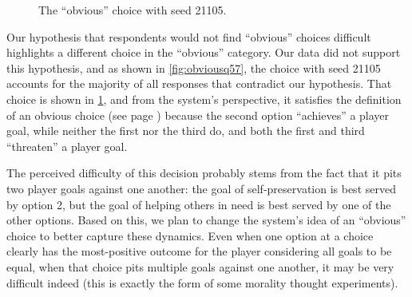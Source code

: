 \begin{figure}[h]
  \caption{The ``obvious'' choice with seed 21105.}
  \label{fig:ch21105}
\end{figure}


Our hypothesis that respondents would not find ``obvious'' choices difficult highlights a different choice in the ``obvious'' category.
%
Our data did not support this hypothesis, and as shown in \cref{fig:obviousq57}, the choice with seed 21105 accounts for the majority of all responses that contradict our hypothesis.
%
That choice is shown in \cref{fig:ch21105}, and from the system's perspective, it satisfies the definition of an obvious choice (see page \pageref{page:choicetypes}) because the second option ``achieves'' a player goal, while neither the first nor the third do, and both the first and third ``threaten'' a player goal.


The perceived difficulty of this decision probably stems from the fact that it pits two player goals against one another: the goal of self-preservation is best served by option 2, but the goal of helping others in need is best served by one of the other options.
%
Based on this, we plan to change the system's idea of an ``obvious'' choice to better capture these dynamics.
%
Even when one option at a choice clearly has the most-positive outcome for the player considering all goals to be equal, when that choice pits multiple goals against one another, it may be very difficult indeed (this is exactly the form of some morality thought experiments).


